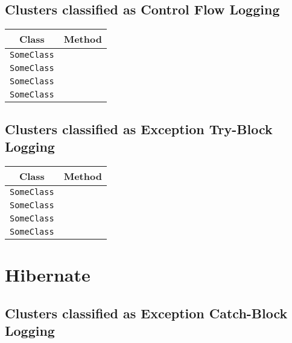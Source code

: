 \subsection{Clusters classified as Control Flow Logging}

\begin{center}
\begin{tabular}{ll}\toprule
\multicolumn{1}{c}{Class}&\multicolumn{1}{c}{Method}\\\midrule
\lstinline/SomeClass/&\raisebox{0pt}{\lstinline/foo(int)/}\\
\lstinline/SomeClass/&\raisebox{0pt}{\lstinline/foo(int)/}\\
\lstinline/SomeClass/&\raisebox{0pt}{\lstinline/foo(int)/}\\
\lstinline/SomeClass/&\raisebox{0pt}{\lstinline/foo(int)/}\\
\bottomrule
\end{tabular}
\end{center}

\subsection{Clusters classified as Exception Try-Block Logging}

\begin{center}
\begin{tabular}{ll}\toprule
\multicolumn{1}{c}{Class}&\multicolumn{1}{c}{Method}\\\midrule
\lstinline/SomeClass/&\raisebox{0pt}{\lstinline/foo(int)/}\\
\lstinline/SomeClass/&\raisebox{0pt}{\lstinline/foo(int)/}\\
\lstinline/SomeClass/&\raisebox{0pt}{\lstinline/foo(int)/}\\
\lstinline/SomeClass/&\raisebox{0pt}{\lstinline/foo(int)/}\\
\bottomrule
\end{tabular}
\end{center}

\section{Hibernate}\label{hibernate}

\subsection{Clusters classified as Exception Catch-Block Logging}


